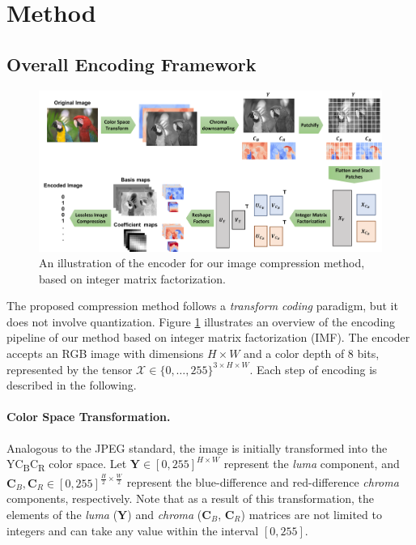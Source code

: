 \section{Method} \label{sec: method}


\subsection{Overall Encoding Framework} \label{sec: overall encoding framework}

\begin{figure}[t]
	\centering
	\includegraphics[width=\linewidth]{figures/imf_encoder.pdf}
	\vspace{10pt}
	\caption{An illustration of the encoder for our image compression method, based on integer matrix factorization.}
	\label{fig: imf_encoder}
\end{figure}

The proposed compression method follows a \emph{transform coding} paradigm, but it does not involve quantization. Figure \ref{fig: imf_encoder} illustrates an overview of the encoding pipeline of our method based on integer matrix factorization (IMF). The encoder accepts an RGB image with dimensions $H \times W$ and a color depth of 8 bits, represented by the tensor $\bm{\mathcal{X}} \in \{0, \ldots, 255\}^{3 \times H \times W}$. Each step of encoding is described in the following.

\paragraph{Color Space Transformation.}
Analogous to the JPEG standard, the image is initially transformed into the YC\textsubscript{B}C\textsubscript{R} color space. Let $\bm{Y} \in [0, 255]^{H \times W}$ represent the \emph{luma} component, and $\bm{C}_B, \bm{C}_R \in [0, 255]^{\frac{H}{2} \times \frac{W}{2}}$ represent the blue-difference and red-difference \emph{chroma} components, respectively. Note that as a result of this transformation, the elements of the \emph{luma} ($\bm{Y}$) and \emph{chroma} ($\bm{C}_B$, $\bm{C}_R$) matrices are not limited to integers and can take any value within the interval $[0, 255]$.

